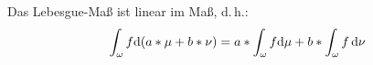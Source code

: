 \begin{*erinnerung}
	Das Lebesgue-Maß ist linear im Maß, d.\,h.:
	\begin{equation}\label{eqLinMasse}
		\int_\omega f \mathrm{d}{(a*\mu + b*\nu)} = a*\int_\omega f \mathrm{d}{\mu} + b*\int_\omega f \, \mathrm{d}{\nu}
	\end{equation}
\end{*erinnerung}
%
%
%
%
